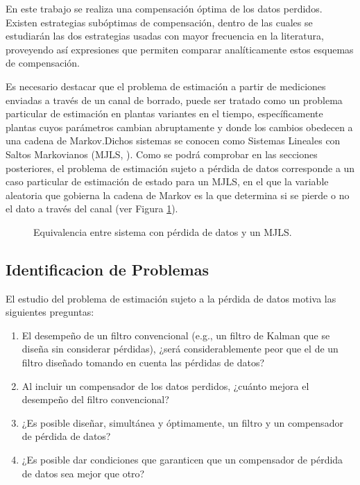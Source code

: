 En este trabajo se realiza una compensaci\'on \'optima de los datos perdidos. Existen estrategias sub\'optimas de compensaci\'on, dentro de las cuales se estudiar\'an las dos estrategias usadas con mayor frecuencia en la literatura, proveyendo as\'i expresiones que permiten comparar anal\'iticamente estos esquemas de compensaci\'on.

Es necesario destacar que el problema de estimaci\'on a partir de mediciones enviadas a trav\'es de un canal de borrado, puede ser tratado como un problema particular de estimaci\'on en plantas variantes en el tiempo, espec\'ificamente plantas cuyos par\'ametros cambian abruptamente y donde los cambios obedecen a una cadena de Markov.Dichos sistemas se conocen como Sistemas Lineales con Saltos Markovianos (MJLS, \cite{cofrma05}). Como se podr\'a comprobar en las secciones posteriores, el problema de estimaci\'on sujeto a p\'erdida de datos corresponde a un caso particular de estimaci\'on de estado para un MJLS, en el que la variable aleatoria que gobierna la cadena de Markov es la que determina si se pierde o no el dato a trav\'es del canal (ver Figura \ref{fig:mjls}).

\begin{figure}[htbp]
\centering
\scalebox{0.8}{}
\caption{Equivalencia entre sistema con p\'erdida de datos y un MJLS.}
\label{fig:mjls}
\end{figure}

\subsection{Identificacion de Problemas}
El estudio del problema de estimaci\'on sujeto a la p\'erdida de datos motiva las siguientes preguntas:
\begin{enumerate}
\item El desempe\~no de un filtro convencional (e.g., un filtro de Kalman que se dise\~na sin considerar p\'erdidas), ¿ser\'a considerablemente peor que el de un filtro dise\~nado tomando en cuenta las p\'erdidas de datos?
\item Al incluir un compensador de los datos perdidos, ¿cu\'anto mejora el desempe\~no del filtro convencional?
\item ¿Es posible dise\~nar, simult\'anea y \'optimamente, un filtro y un compensador de p\'erdida de datos?
\item ¿Es posible dar condiciones que garanticen que un compensador de p\'erdida de datos sea mejor que otro?
\end{enumerate}

